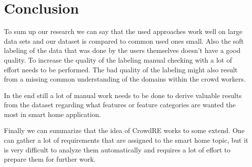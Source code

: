 \section{Conclusion} %
\label{sec:conclusion}

To sum up our research we can say that the used approaches work well on large data sets and our dataset is compared to common used ones small. Also the soft labeling of the data that was done by the users themselves doesn't have a good quality. To increase the quality of the labeling manual checking with a lot of effort needs to be performed. The bad quality of the labeling might also result from a missing common understanding of the domains within the crowd workers.

In the end still a lot of manual work needs to be done to derive valuable results from the dataset regarding what features or feature categories are wanted the most in smart home application.

Finally we can summarize that the idea of CrowdRE works to some extend. One can gather a lot of requirements that are assigned to the smart home topic, but it is very difficult to analyze them automatically and requires a lot of effort to prepare them for further work.


